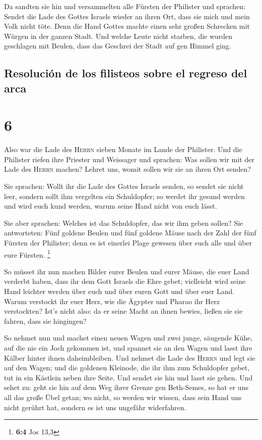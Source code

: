  Da sandten sie hin und versammelten alle Fürsten der
Philister und sprachen: Sendet die Lade des Gottes Israels wieder an
ihren Ort, dass sie mich und mein Volk nicht töte. Denn die Hand Gottes
machte einen sehr großen Schrecken mit Würgen in der ganzen Stadt.
 Und welche Leute nicht starben, die wurden geschlagen
mit Beulen, dass das Geschrei der Stadt auf gen Himmel ging.

\hypertarget{resoluciuxf3n-de-los-filisteos-sobre-el-regreso-del-arca}{%
\subsection{Resolución de los filisteos sobre el regreso del
arca}\label{resoluciuxf3n-de-los-filisteos-sobre-el-regreso-del-arca}}

\hypertarget{section-5}{%
\section{6}\label{section-5}}

 Also war die Lade des \textsc{Herrn} sieben Monate im
Lande der Philister.  Und die Philister riefen ihre
Priester und Weissager und sprachen: Was sollen wir mit der Lade des
\textsc{Herrn} machen? Lehret uns, womit sollen wir sie an ihren Ort
senden?

 Sie sprachen: Wollt ihr die Lade des Gottes Israels
senden, so sendet sie nicht leer, sondern sollt ihm vergelten ein
Schuldopfer; so werdet ihr gesund werden und wird euch kund werden,
warum seine Hand nicht von euch lässt.

 Sie aber sprachen: Welches ist das Schuldopfer, das wir
ihm geben sollen? Sie antworteten: Fünf goldene Beulen und fünf goldene
Mäuse nach der Zahl der fünf Fürsten der Philister; denn es ist einerlei
Plage gewesen über euch alle und über eure Fürsten. \footnote{\textbf{6:4}
  Jos 13,3}

 So müsset ihr nun machen Bilder eurer Beulen und eurer
Mäuse, die euer Land verderbt haben, dass ihr dem Gott Israels die Ehre
gebet; vielleicht wird seine Hand leichter werden über euch und über
euren Gott und über euer Land.  Warum verstockt ihr euer
Herz, wie die Ägypter und Pharao ihr Herz verstockten? Ist's nicht also:
da er seine Macht an ihnen bewies, ließen sie sie fahren, dass sie
hingingen?

 So nehmet nun und machet einen neuen Wagen und zwei
junge, säugende Kühe, auf die nie ein Joch gekommen ist, und spannet sie
an den Wagen und lasst ihre Kälber hinter ihnen daheimbleiben.
 Und nehmet die Lade des \textsc{Herrn} und legt sie auf
den Wagen; und die goldenen Kleinode, die ihr ihm zum Schuldopfer gebet,
tut in ein Kästlein neben ihre Seite. Und sendet sie hin und lasst sie
gehen.  Und sehet zu: geht sie hin auf dem Weg ihrer
Grenze gen Beth-Semes, so hat er uns all das große Übel getan; wo nicht,
so werden wir wissen, dass sein Hand uns nicht gerührt hat, sondern es
ist uns ungefähr widerfahren.

